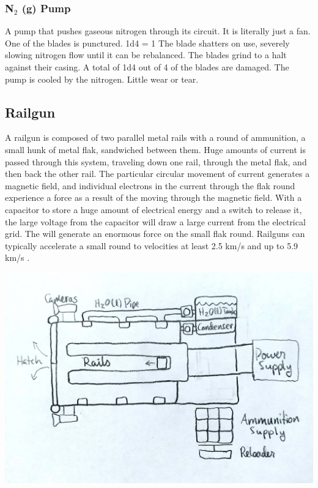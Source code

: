 \documentclass[a4paper]{article}
\begin{document}
\vspace{-0.5cm} \hspace{-18pt} \subsubsection{N$_2$ (g) Pump} \label{thermal_n2_pump} \vspace{-0.2cm}
A pump that pushes gaseous nitrogen through its circuit. It is literally just a fan.
\\ \pbhw
{One of the blades is punctured. \newline 1d4 = 1 The blade shatters on use, severely slowing nitrogen flow until it can be rebalanced.}
{The blades grind to a halt against their casing. A total of 1d4 out of 4 of the blades are damaged.}
{The pump is cooled by the nitrogen.}
{Little wear or tear.}


\newpage
\subsection{Railgun} \label{railgun}

A railgun is composed of two parallel metal rails with a round of ammunition, a small hunk of metal flak, sandwiched between them. Huge amounts of current is passed through this system, traveling down one rail, through the metal flak, and then back the other rail. The particular circular movement of current generates a magnetic field, and individual electrons in the current through the flak round experience a force as a result of the moving through the magnetic field. With a capacitor to store a huge amount of electrical energy and a switch to release it, the large voltage from the capacitor will draw a large current from the electrical grid. The will generate an enormous force on the small flak round. Railguns can typically accelerate a small round to velocities at least 2.5 km/s \cite{naval_railgun} and up to 5.9 km/s \cite{scientific_railgun}.

\vspace{0.2cm}
\includegraphics[scale=0.275]{Railgun}
\end{document}
